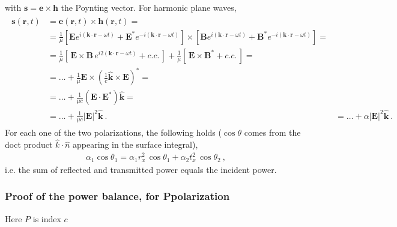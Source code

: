 \documentclass[letterpaper,10pt,italian]{jupyterBook}
\begin{document}
\sphinxAtStartPar
with \(\mathbf{s} = \mathbf{e} \times \mathbf{h}\) the Poynting vector. For harmonic plane waves,
\begin{equation*}
\begin{split}\begin{aligned}
  \mathbf{s}(\mathbf{r},t) 
  & = \mathbf{e}(\mathbf{r},t) \times \mathbf{h}(\mathbf{r},t) = \\
  & = \frac{1}{\mu} \left[ \mathbf{E} e^{i(\mathbf{k} \cdot \mathbf{r} - \omega t)} + \mathbf{E}^* e^{-i(\mathbf{k} \cdot \mathbf{r} - \omega t)} \right] \times \left[ \mathbf{B} e^{i(\mathbf{k} \cdot \mathbf{r} - \omega t)} + \mathbf{B}^* e^{-i(\mathbf{k} \cdot \mathbf{r} - \omega t)}  \right] = \\
  & = \frac{1}{\mu} \left[ \, \mathbf{E} \times \mathbf{B} \, e^{i 2(\mathbf{k} \cdot \mathbf{r} - \omega t)} + c.c. \, \right] + \frac{1}{\mu} \left[ \, \mathbf{E} \times \mathbf{B}^* + c.c. \, \right] = \\
  & = \dots + \frac{1}{\mu} \mathbf{E} \times \left( \frac{1}{c} \hat{\mathbf{k}} \times \mathbf{E} \right)^* = \\
  & = \dots + \frac{1}{\mu c} \left( \mathbf{E} \cdot \mathbf{E}^* \right) \hat{\mathbf{k}} = \\
  & = \dots + \frac{1}{\mu c} | \mathbf{E} |^2 \hat{\mathbf{k}} \ .
  & = \dots + \alpha | \mathbf{E} |^2 \hat{\mathbf{k}} \ .
\end{aligned}\end{split}
\end{equation*}
\sphinxAtStartPar
For each one of the two polarizations, the following holds (\(\cos \theta\) comes from the doct product \(\hat{k} \cdot \hat{n}\) appearing in the surface integral),
\begin{equation*}
\begin{split}\alpha_1 \cos \theta_1 = \alpha_1 r_x^2 \, \cos \theta_1 + \alpha_2 t_x^2 \, \cos \theta_2 \ ,\end{split}
\end{equation*}
\sphinxAtStartPar
i.e. the sum of reflected and transmitted power equals the incident power.
\subsubsection*{Proof of the power balance, for P\sphinxhyphen{}polarization}

\sphinxAtStartPar
{} Here \(P\) is index \(c\)
\end{document}
